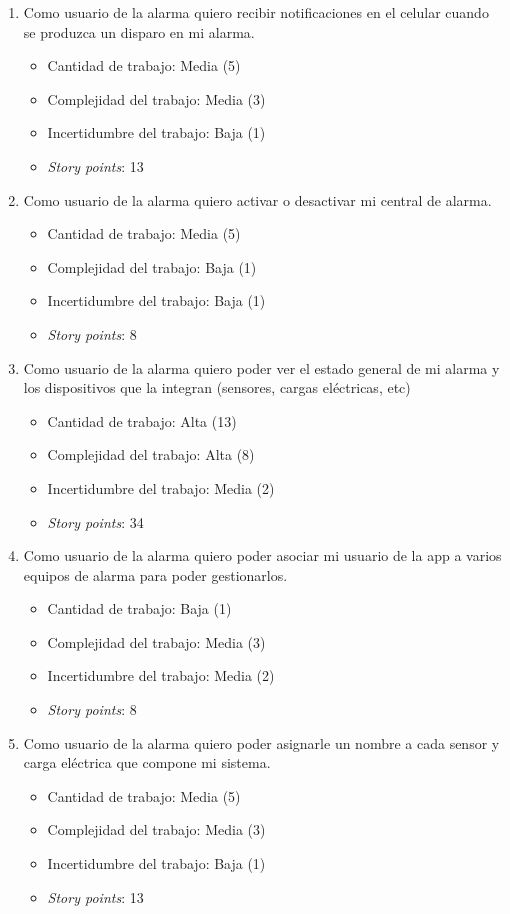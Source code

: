 \documentclass[
11pt, %
codirector, %
]{charter}
\begin{document}
\begin{enumerate}
	\item Como usuario de la alarma quiero recibir notificaciones en el celular cuando se produzca un disparo en mi alarma.
	\begin{itemize}
		\item Cantidad de trabajo: Media (5)
		\item Complejidad del trabajo: Media (3)
		\item Incertidumbre del trabajo: Baja (1)
		\item \textit{Story points}: 13
	\end{itemize}
	
	\item Como usuario de la alarma quiero activar o desactivar mi central de alarma.
	\begin{itemize}
		\item Cantidad de trabajo: Media (5)
		\item Complejidad del trabajo: Baja (1)
		\item Incertidumbre del trabajo: Baja (1)
		\item \textit{Story points}: 8
	\end{itemize}
	
	\item Como usuario de la alarma quiero poder ver el estado general de mi alarma y los dispositivos que la integran (sensores, cargas eléctricas, etc)
	\begin{itemize}
		\item Cantidad de trabajo: Alta (13)
		\item Complejidad del trabajo: Alta (8)
		\item Incertidumbre del trabajo: Media (2)
		\item \textit{Story points}: 34
	\end{itemize}
	
	\item Como usuario de la alarma quiero poder asociar mi usuario de la app a varios equipos de alarma para poder gestionarlos.
	\begin{itemize}
		\item Cantidad de trabajo: Baja (1)
		\item Complejidad del trabajo: Media (3)
		\item Incertidumbre del trabajo: Media (2)
		\item \textit{Story points}: 8
	\end{itemize}
	
	\item Como usuario de la alarma quiero poder asignarle un nombre a cada sensor y carga eléctrica que compone mi sistema.
	\begin{itemize}
		\item Cantidad de trabajo: Media (5)
		\item Complejidad del trabajo: Media (3)
		\item Incertidumbre del trabajo: Baja (1)
		\item \textit{Story points}: 13
	\end{itemize}
\end{enumerate}
\end{document}
